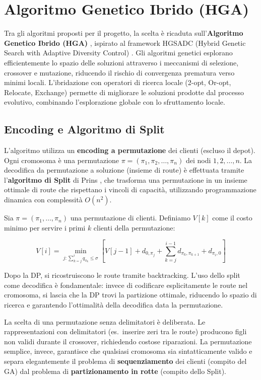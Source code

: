 \chapter{Algoritmo Genetico Ibrido (HGA)}

Tra gli algoritmi proposti per il progetto, la scelta \`e ricaduta
sull'\textbf{Algoritmo Genetico Ibrido (HGA)} \cite{holland1975adaptation, goldberg1989genetic}, ispirato al framework HGSADC (Hybrid Genetic Search with Adaptive Diversity Control) \cite{vidal2012unified}.
Gli algoritmi genetici esplorano
efficientemente lo spazio delle soluzioni attraverso i meccanismi di selezione,
crossover e mutazione, riducendo il rischio di convergenza prematura verso minimi
locali. L'ibridazione con operatori di ricerca locale (2-opt, Or-opt, Relocate,
Exchange) \cite{lin1973effective, or1976traveling} permette di migliorare le soluzioni prodotte dal processo evolutivo,
combinando l'esplorazione globale con lo sfruttamento locale.

\section{Encoding e Algoritmo di Split}

L'algoritmo utilizza un \textbf{encoding a permutazione} dei clienti (escluso il depot).
Ogni cromosoma \`e una permutazione $\pi = (\pi_1, \pi_2, \dots, \pi_n)$ dei nodi
$1, 2, \dots, n$. La decodifica da permutazione a soluzione (insieme di route) \`e
effettuata tramite l'\textbf{algoritmo di Split} di Prins \cite{prins2004simple}, che trasforma una
permutazione in un insieme ottimale di route che rispettano i vincoli di capacit\`a,
utilizzando programmazione dinamica con complessit\`a $O(n^2)$.

Sia $\pi = (\pi_1, \dots, \pi_n)$ una permutazione di clienti. Definiamo $V[k]$
come il costo minimo per servire i primi $k$ clienti della permutazione:

$$V[i] = \min_{j: \sum_{k=j}^{i} q_{\pi_k} \leq \sigma} \left[ V[j-1] + d_{0,\pi_j} + \sum_{k=j}^{i-1} d_{\pi_k,\pi_{k+1}} + d_{\pi_i,0} \right]$$

Dopo la DP, si ricostruiscono le route tramite backtracking. L'uso dello split come
decodifica \`e fondamentale: invece di codificare esplicitamente le route nel cromosoma,
si lascia che la DP trovi la partizione ottimale, riducendo lo spazio di ricerca e
garantendo l'ottimalit\`a della decodifica data la permutazione.

La scelta di una permutazione senza delimitatori \`e deliberata. Le rappresentazioni
con delimitatori (es.\ inserire zeri tra le route) producono figli non validi durante
il crossover, richiedendo costose riparazioni. La permutazione semplice, invece,
garantisce che qualsiasi cromosoma sia sintatticamente valido e separa elegantemente
il problema di \textbf{sequenziamento} dei clienti (compito del GA) dal problema di
\textbf{partizionamento in rotte} (compito dello Split).

